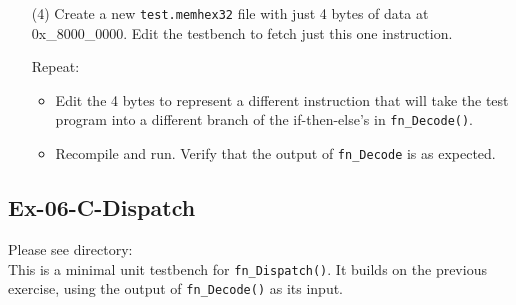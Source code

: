 \begin{itemize}
\item[(4)] Create a new \verb|test.memhex32| file with just 4 bytes of
    data at 0x\_8000\_0000.  Edit the testbench to fetch just this one
    instruction.

    Repeat:
    \begin{itemize}

    \item Edit the 4 bytes to represent a different instruction that
      will take the test program into a different branch of the
      if-then-else's in \verb|fn_Decode()|.

    \item Recompile and run. Verify that the output of
      \verb|fn_Decode| is as expected.

    \end{itemize}

\end{itemize}


\subsection*{Ex-06-C-Dispatch}

\label{Ex-06-C-Dispatch}

Please see directory:  \\
This is a minimal unit testbench for \verb|fn_Dispatch()|.  It builds
on the previous exercise, using the output of \verb|fn_Decode()| as
its input.

